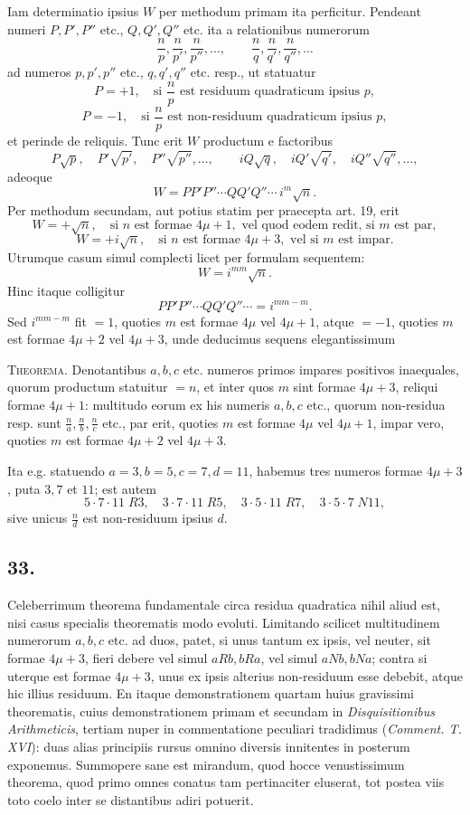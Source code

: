\documentclass[12pt]{article}
\begin{document}
Iam determinatio ipsius $W$ per methodum primam ita perficitur. Pendeant numeri $P,P',P''$ etc., $Q,Q',Q''$ etc. ita a relationibus numerorum
\[
\frac{n}{p},\frac{n}{p'},\frac{n}{p''},\ldots,\qquad
\frac{n}{q},\frac{n}{q'},\frac{n}{q''},\ldots
\]
ad numeros $p,p',p''$ etc., $q,q',q''$ etc. resp., ut statuatur
\[
P=+1,\quad\text{si }\frac{n}{p}\text{ est residuum quadraticum ipsius }p,
\]
\[
P=-1,\quad\text{si }\frac{n}{p}\text{ est non-residuum quadraticum ipsius }p,
\]
et perinde de reliquis. Tunc erit $W$ productum e factoribus
\[
P\sqrt p,\quad P'\sqrt{p'},\quad P''\sqrt{p''},\ldots,\qquad
iQ\sqrt q,\quad iQ'\sqrt{q'},\quad iQ''\sqrt{q''},\ldots,
\]
adeoque
\[
W=PP'P''\cdots QQ'Q''\cdots\, i^m\sqrt n.
\]
Per methodum secundam, aut potius statim per praecepta art. 19, erit
\[
W=+\sqrt n,\quad\text{si }n\text{ est formae }4\mu+1,\text{ vel quod eodem redit, si }m\text{ est par},
\]
\[
W=+i\sqrt n,\quad\text{si }n\text{ est formae }4\mu+3,\text{ vel si }m\text{ est impar}.
\]
Utrumque casum simul complecti licet per formulam sequentem:
\[
W=i^{mm}\sqrt n.
\]
Hinc itaque colligitur
\[
PP'P''\cdots QQ'Q''\cdots=i^{mm-m}.
\]
Sed $i^{mm-m}$ fit $=1$, quoties $m$ est formae $4\mu$ vel $4\mu+1$, atque $=-1$, quoties $m$ est formae $4\mu+2$ vel $4\mu+3$, unde deducimus sequens elegantissimum

\textsc{Theorema.} Denotantibus $a,b,c$ etc. numeros primos impares positivos inaequales, quorum productum statuitur $=n$, et inter quos $m$ sint formae $4\mu+3$, reliqui formae $4\mu+1$: multitudo eorum ex his numeris $a,b,c$ etc., quorum non-residua resp. sunt $\frac{n}{a},\frac{n}{b},\frac{n}{c}$ etc., par erit, quoties $m$ est formae $4\mu$ vel $4\mu+1$, impar vero, quoties $m$ est formae $4\mu+2$ vel $4\mu+3$.

Ita e.g. statuendo $a=3,b=5,c=7,d=11$, habemus tres numeros formae $4\mu+3$, puta $3,7$ et $11$; est autem
\[
5\cdot7\cdot11\;R3,\quad
3\cdot7\cdot11\;R5,\quad
3\cdot5\cdot11\;R7,\quad
3\cdot5\cdot7\;N11,
\]
sive unicus $\frac{n}{d}$ est non-residuum ipsius $d$.

\subsection*{33.}

Celeberrimum theorema fundamentale circa residua quadratica nihil aliud est, nisi casus specialis theorematis modo evoluti. Limitando scilicet multitudinem numerorum $a,b,c$ etc. ad duos, patet, si unus tantum ex ipsis, vel neuter, sit formae $4\mu+3$, fieri debere vel simul $aRb,bRa$, vel simul $aNb,bNa$; contra si uterque est formae $4\mu+3$, unus ex ipsis alterius non-residuum esse debebit, atque hic illius residuum. En itaque demonstrationem quartam huius gravissimi theorematis, cuius demonstrationem primam et secundam in \emph{Disquisitionibus Arithmeticis}, tertiam nuper in commentatione peculiari tradidimus (\emph{Comment. T. XVI}): duas alias principiis rursus omnino diversis innitentes in posterum exponemus. Summopere sane est mirandum, quod hocce venustissimum theorema, quod primo omnes conatus tam pertinaciter eluserat, tot postea viis toto coelo inter se distantibus adiri potuerit.
\end{document}
